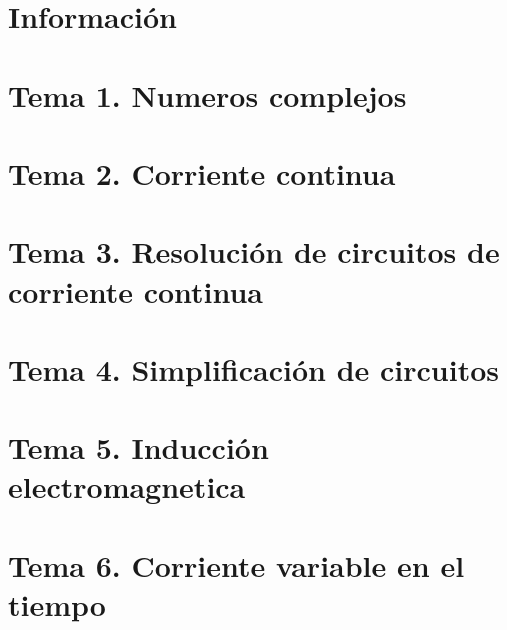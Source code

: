 \documentclass[12pt, twoside, openright]{report} %
\begin{document}
\clearpage
{} %



\part{Información}



\part{Tema 1. Numeros complejos}



\part{Tema 2. Corriente continua}



\part{Tema 3. Resolución de circuitos de corriente continua}




\part{Tema 4. Simplificación de circuitos}



\part{Tema 5. Inducción electromagnetica}



\part{Tema 6. Corriente variable en el tiempo}


\end{document}
